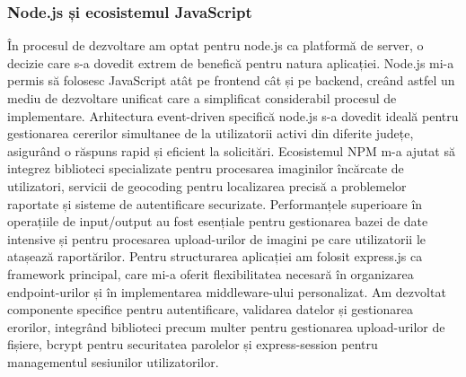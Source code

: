 \documentclass[12pt,a4paper]{report}
\begin{document}
\subsubsection{Node.js și ecosistemul JavaScript}
În procesul de dezvoltare am optat pentru node.js ca platformă de server, o decizie care s-a dovedit extrem de benefică pentru natura aplicației. Node.js mi-a permis să folosesc JavaScript atât pe frontend cât și pe backend, creând astfel un mediu de dezvoltare unificat care a simplificat considerabil procesul de implementare. Arhitectura event-driven specifică node.js s-a dovedit ideală pentru gestionarea cererilor simultanee de la utilizatorii activi din diferite județe, asigurând o răspuns rapid și eficient la solicitări.
Ecosistemul NPM m-a ajutat să integrez biblioteci specializate pentru procesarea imaginilor încărcate de utilizatori, servicii de geocoding pentru localizarea precisă a problemelor raportate și sisteme de autentificare securizate. Performanțele superioare în operațiile de input/output au fost esențiale pentru gestionarea bazei de date intensive și pentru procesarea upload-urilor de imagini pe care utilizatorii le atașează raportărilor.
Pentru structurarea aplicației am folosit express.js ca framework principal, care mi-a oferit flexibilitatea necesară în organizarea endpoint-urilor și în implementarea middleware-ului personalizat. Am dezvoltat componente specifice pentru autentificare, validarea datelor și gestionarea erorilor, integrând biblioteci precum multer pentru gestionarea upload-urilor de fișiere, bcrypt pentru securitatea parolelor și express-session pentru managementul sesiunilor utilizatorilor.
\end{document}
